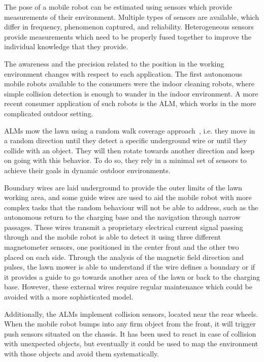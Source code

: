 The pose of a mobile robot can be estimated using sensors which provide measurements of their environment.
Multiple types of sensors are available, which differ in frequency, phenomenon captured, and reliability.
Heterogeneous sensors provide measurements which need to be properly fused together to improve the individual knowledge that they provide.

The awareness and the precision related to the position in the working environment changes with respect to each application.
The first autonomous mobile robots available to the consumers were the indoor cleaning robots, where simple collision detection is enough to wander in the indoor environment.
A more recent consumer application of such robots is the \gls{ALM}, which works in the more complicated outdoor setting.

\glspl{ALM} mow the lawn using a random walk coverage approach~\cite{karol_ardic_conditional_2016}, i.e. they move in a random direction until they detect a specific underground wire or until they collide with an object.
They will then rotate towards another direction and keep on going with this behavior.
To do so, they rely in a minimal set of sensors to achieve their goals in dynamic outdoor environments.

Boundary wires are laid underground to provide the outer limits of the lawn working area, and some guide wires are used to aid the mobile robot with more complex tasks that the random behaviour will not be able to address, such as the autonomous return to the charging base and the navigation through narrow passages.
These wires transmit a proprietary electrical current signal passing through and the mobile robot is able to detect it using three different magnetometer sensors, one positioned in the center front and the other two placed on each side.
Through the analysis of the magnetic field direction and pulses, the lawn mower is able to understand if the wire defines a boundary or if it provides a guide to go towards another area of the lawn or back to the charging base.
However, these external wires require regular maintenance which could be avoided with a more sophisticated model.

Additionally, the \glspl{ALM} implement collision sensors, located near the rear wheels.
When the mobile robot bumps into any firm object from the front, it will trigger push sensors situated on the chassis.
It has been used to react in case of collision with unexpected objects, but eventually it could be used to map the environment with those objects and avoid them systematically.


